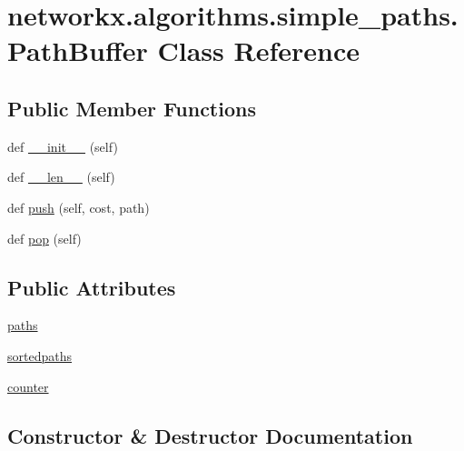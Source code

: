 \hypertarget{classnetworkx_1_1algorithms_1_1simple__paths_1_1PathBuffer}{}\section{networkx.\+algorithms.\+simple\+\_\+paths.\+Path\+Buffer Class Reference}
\label{classnetworkx_1_1algorithms_1_1simple__paths_1_1PathBuffer}
\subsection*{Public Member Functions}
\begin{DoxyCompactItemize}
\item 
def \hyperlink{classnetworkx_1_1algorithms_1_1simple__paths_1_1PathBuffer_af6aa4dfb0ca7a1dfc856169a446ccd13}{\+\_\+\+\_\+init\+\_\+\+\_\+} (self)
\item 
def \hyperlink{classnetworkx_1_1algorithms_1_1simple__paths_1_1PathBuffer_a1236cb11b41e070616e9496536cb3bac}{\+\_\+\+\_\+len\+\_\+\+\_\+} (self)
\item 
def \hyperlink{classnetworkx_1_1algorithms_1_1simple__paths_1_1PathBuffer_a64c659c60b097c467af0d20840672727}{push} (self, cost, path)
\item 
def \hyperlink{classnetworkx_1_1algorithms_1_1simple__paths_1_1PathBuffer_a2d6a9c8f76055ea52c520a4b8b1087b9}{pop} (self)
\end{DoxyCompactItemize}
\subsection*{Public Attributes}
\begin{DoxyCompactItemize}
\item 
\hyperlink{classnetworkx_1_1algorithms_1_1simple__paths_1_1PathBuffer_ada6ec73cafcbc2b19bcf601445873792}{paths}
\item 
\hyperlink{classnetworkx_1_1algorithms_1_1simple__paths_1_1PathBuffer_a8fbb95735efceb3125037c6fd3f09aaa}{sortedpaths}
\item 
\hyperlink{classnetworkx_1_1algorithms_1_1simple__paths_1_1PathBuffer_a3d278c2282ffa8f1369bae433b86d39d}{counter}
\end{DoxyCompactItemize}


\subsection{Constructor \& Destructor Documentation}
\mbox{\label{classnetworkx_1_1algorithms_1_1simple__paths_1_1PathBuffer_af6aa4dfb0ca7a1dfc856169a446ccd13}} 
